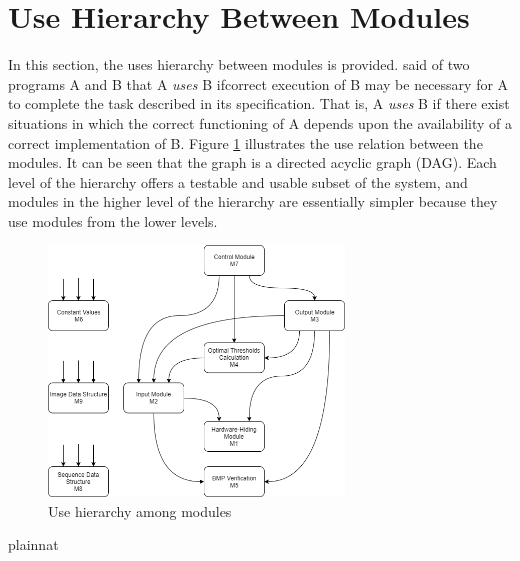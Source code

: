 \documentclass[12pt, titlepage]{article}
\begin{document}
\section{Use Hierarchy Between Modules} \label{SecUse}

In this section, the uses hierarchy between modules is
provided. \citet{Parnas1978} said of two programs A and B that A {\em uses} B
ifcorrect execution of B may be necessary for A to complete the task described
in
its specification. That is, A {\em uses} B if there exist situations in which
the correct functioning of A depends upon the availability of a correct
implementation of B.  Figure \ref{FigUH} illustrates the use relation between
the modules. It can be seen that the graph is a directed acyclic graph
(DAG). Each level of the hierarchy offers a testable and usable subset of the
system, and modules in the higher level of the hierarchy are essentially
simpler because they use modules from the lower levels.

\begin{figure}[H]
\centering
\includegraphics[width=0.7\textwidth]{UsesHierarchy.png}
\caption{Use hierarchy among modules}
\label{FigUH}
\end{figure}


 {plainnat}

\end{document}
